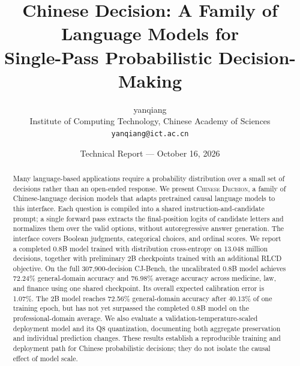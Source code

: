\documentclass[10pt,twocolumn]{article}
\title{\textbf{Chinese Decision: A Family of Language Models for\\Single-Pass Probabilistic Decision-Making}}
\author{yanqiang\\Institute of Computing Technology, Chinese Academy of Sciences\\\texttt{yanqiang@ict.ac.cn}}
\date{Technical Report --- October 16, 2026}
\newcommand{\model}{\textsc{Chinese Decision}}
\begin{document}
\maketitle
\begin{abstract}
Many language-based applications require a probability distribution over a small set of decisions rather than an open-ended response. We present \model, a family of Chinese-language decision models that adapts pretrained causal language models to this interface. Each question is compiled into a shared instruction-and-candidate prompt; a single forward pass extracts the final-position logits of candidate letters and normalizes them over the valid options, without autoregressive answer generation. The interface covers Boolean judgments, categorical choices, and ordinal scores. We report a completed 0.8B model trained with distribution cross-entropy on 13.048 million decisions, together with preliminary 2B checkpoints trained with an additional RLCD objective. On the full 307,900-decision CJ-Bench, the uncalibrated 0.8B model achieves 72.24\% general-domain accuracy and 76.98\% average accuracy across medicine, law, and finance using one shared checkpoint. Its overall expected calibration error is 1.07\%. The 2B model reaches 72.56\% general-domain accuracy after 40.13\% of one training epoch, but has not yet surpassed the completed 0.8B model on the professional-domain average. We also evaluate a validation-temperature-scaled deployment model and its Q8 quantization, documenting both aggregate preservation and individual prediction changes. These results establish a reproducible training and deployment path for Chinese probabilistic decisions; they do not isolate the causal effect of model scale.
\end{abstract}






\FloatBarrier


\clearpage
\appendix

\end{document}
